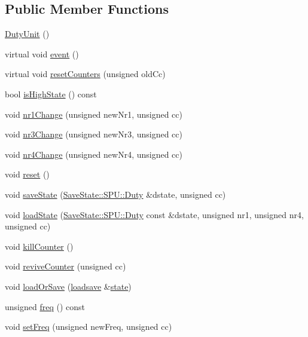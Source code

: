 \subsection*{Public Member Functions}
\begin{DoxyCompactItemize}
\item 
\hyperlink{classgambatte_1_1DutyUnit_a4313410af8c15cb68eb276df92639b86}{Duty\+Unit} ()
\item 
virtual void \hyperlink{classgambatte_1_1DutyUnit_a2f051bb4772d30c58f2e88b85e947e61}{event} ()
\item 
virtual void \hyperlink{classgambatte_1_1DutyUnit_a69b982611026639129fda42e637e7b12}{reset\+Counters} (unsigned old\+Cc)
\item 
bool \hyperlink{classgambatte_1_1DutyUnit_a8c1e7cb1c7de208555b585e565b134c9}{is\+High\+State} () const
\item 
void \hyperlink{classgambatte_1_1DutyUnit_a5ba57779a4204bfc729b69f4d4304597}{nr1\+Change} (unsigned new\+Nr1, unsigned cc)
\item 
void \hyperlink{classgambatte_1_1DutyUnit_a6ef2e5973a348588ab05f78f93de6295}{nr3\+Change} (unsigned new\+Nr3, unsigned cc)
\item 
void \hyperlink{classgambatte_1_1DutyUnit_aa7e53abb8b26dca277a0447da8dad150}{nr4\+Change} (unsigned new\+Nr4, unsigned cc)
\item 
void \hyperlink{classgambatte_1_1DutyUnit_a0062af72b8d6b7220e82109b53f5e250}{reset} ()
\item 
void \hyperlink{classgambatte_1_1DutyUnit_a2326dd372384fb52466e307946717f65}{save\+State} (\hyperlink{structgambatte_1_1SaveState_1_1SPU_1_1Duty}{Save\+State\+::\+S\+P\+U\+::\+Duty} \&dstate, unsigned cc)
\item 
void \hyperlink{classgambatte_1_1DutyUnit_a64f049070cbd7ba7157410953186312b}{load\+State} (\hyperlink{structgambatte_1_1SaveState_1_1SPU_1_1Duty}{Save\+State\+::\+S\+P\+U\+::\+Duty} const \&dstate, unsigned nr1, unsigned nr4, unsigned cc)
\item 
void \hyperlink{classgambatte_1_1DutyUnit_a9def301fa5ff4359c4793a5fda3eb09c}{kill\+Counter} ()
\item 
void \hyperlink{classgambatte_1_1DutyUnit_a80e058f8c2210c9e7a52cceecaac4cde}{revive\+Counter} (unsigned cc)
\item 
void \hyperlink{classgambatte_1_1DutyUnit_adfb8ad7e89551ee6c384e010fa51fba6}{load\+Or\+Save} (\hyperlink{classgambatte_1_1loadsave}{loadsave} \&\hyperlink{ppu_8cpp_a2f2eca6997ee7baf8901725ae074d45b}{state})
\item 
unsigned \hyperlink{classgambatte_1_1DutyUnit_a2533194e4d5e582e962fe19b84377b70}{freq} () const
\item 
void \hyperlink{classgambatte_1_1DutyUnit_ac852c8510e1b1c8c0d7e8a63270167bf}{set\+Freq} (unsigned new\+Freq, unsigned cc)
\end{DoxyCompactItemize}
